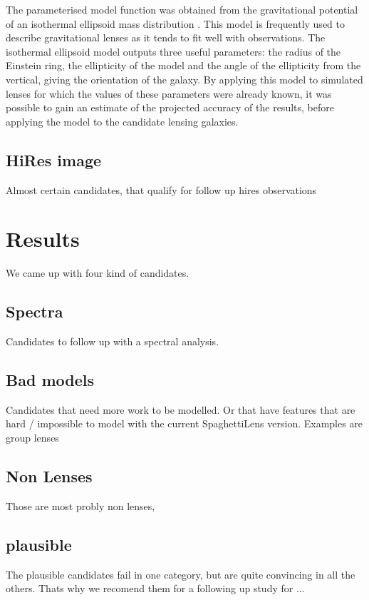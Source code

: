 \documentclass[fleqn,usenatbib]{mnras}
\begin{document}
The parameterised model function was obtained from the gravitational potential of an isothermal ellipsoid mass distribution \cite{2001astro.ph..2340K}.
This model is frequently used to describe gravitational lenses as it tends to fit well with observations.
The isothermal ellipsoid model outputs three useful parameters: the radius of the Einstein ring, the ellipticity of the model and the angle of the ellipticity from the vertical, giving the orientation of the galaxy.
By applying this model to simulated lenses for which the values of these parameters were already known, it was possible to gain an estimate of the projected accuracy of the results, before applying the model to the candidate lensing galaxies.


\subsection{HiRes image}
Almost certain candidates, that qualify for follow up hires observations






\section{Results}
We came up with four kind of candidates.


\subsection{Spectra}
Candidates to follow up with a spectral analysis. 


\subsection{Bad models}
Candidates that need more work to be modelled.
Or that have features that are hard / impossible to model with the current SpaghettiLens version.
Examples are group lenses



\subsection{Non Lenses}
Those are most probly non lenses, 



\subsection{plausible}
  The plausible candidates fail in one category, but are quite convincing in all the others.
  Thats why we recomend them for a following up study for ...
\end{document}
